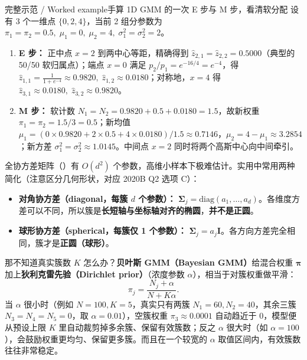 \begin{StudyBlock}{完整示范 / Worked example}{手算 1D GMM 的一次 E 步与 M 步，看清软分配}
设有 3 个一维点 $\{0, 2, 4\}$，当前 2 组分参数为 $\pi_1=\pi_2=0.5,\;\mu_1=0,\;\mu_2=4,\;\sigma_1^2=\sigma_2^2=2$。
\begin{enumerate}
\item \textbf{E 步：} 正中点 $x=2$ 到两中心等距，精确得到 $\hat{z}_{2,1}=\hat{z}_{2,2}=0.5000$（典型的 50/50 软归属点）；端点 $x=0$ 满足 $p_2/p_1 = e^{-16/4}=e^{-4}$，得 $\hat{z}_{1,1}=\frac{1}{1+e^{-4}}\approx 0.9820,\;\hat{z}_{1,2}\approx 0.0180$；对称地，$x=4$ 得 $\hat{z}_{3,1}\approx 0.0180,\;\hat{z}_{3,2}\approx 0.9820$。
\item \textbf{M 步：} 软计数 $N_1 = N_2 = 0.9820 + 0.5 + 0.0180 = 1.5$，故新权重 $\pi_1=\pi_2=1.5/3=0.5$；新均值 $\mu_1 = (0\times 0.9820 + 2\times 0.5 + 4\times 0.0180)/1.5 \approx 0.7146$，$\mu_2 = 4 - \mu_1 \approx 3.2854$；新方差 $\sigma_1^2 = \sigma_2^2 \approx 1.0145$。中间点 $x=2$ 同时将两个高斯中心向中间牵引。
\end{enumerate}
\end{StudyBlock}


全协方差矩阵（）有 $O(d^2)$ 个参数，高维小样本下极难估计。实用中常用两种简化（注意区分几何形状，对应 2020B Q2 选项 C）：
\begin{itemize}
\item \textbf{对角协方差（diagonal，每簇 $d$ 个参数）：} $\boldsymbol{\Sigma}_j = \mathrm{diag}(a_1,\dots,a_d)$。各维度方差可以不同，所以簇是\textbf{长短轴与坐标轴对齐的椭圆}，\textbf{并不是正圆}。
\item \textbf{球形协方差（spherical，每簇仅 1 个参数）：} $\boldsymbol{\Sigma}_j = a_j\mathbf{I}$。各方向方差完全相同，簇才是\textbf{正圆（球形）}。
\end{itemize}

那不知道真实簇数 $K$ 怎么办？\textbf{贝叶斯 GMM（Bayesian GMM）}给混合权重 $\boldsymbol{\pi}$ 加上\textbf{狄利克雷先验（Dirichlet prior）}（浓度参数 $\alpha$），相当于对簇权重做平滑：
\[
\pi_j = \frac{N_j + \alpha}{N + K\alpha}.
\tag{9.7}
\]
当 $\alpha$ 很小时（例如 $N=100, K=5$，真实只有两簇 $N_1=60, N_2=40$，其余三簇 $N_3=N_4=N_5=0$，取 $\alpha=0.01$），空簇权重 $\pi_3 \approx 0.0001$ 自动趋近于 0，模型便从预设上限 $K$ 里自动裁剪掉多余簇、保留有效簇数；反之 $\alpha$ 很大时（如 $\alpha=100$），会鼓励权重更均匀、保留更多簇。而且在一个较宽的 $\alpha$ 取值区间内，有效簇数往往非常稳定。

